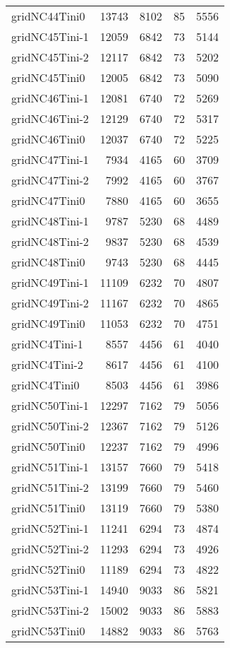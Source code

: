 \begin{longtable}{lrrrr}
gridNC44Tini0 & 13743 & 8102 & 85 & 5556 \\
gridNC45Tini-1 & 12059 & 6842 & 73 & 5144 \\
gridNC45Tini-2 & 12117 & 6842 & 73 & 5202 \\
gridNC45Tini0 & 12005 & 6842 & 73 & 5090 \\
gridNC46Tini-1 & 12081 & 6740 & 72 & 5269 \\
gridNC46Tini-2 & 12129 & 6740 & 72 & 5317 \\
gridNC46Tini0 & 12037 & 6740 & 72 & 5225 \\
gridNC47Tini-1 & 7934 & 4165 & 60 & 3709 \\
gridNC47Tini-2 & 7992 & 4165 & 60 & 3767 \\
gridNC47Tini0 & 7880 & 4165 & 60 & 3655 \\
gridNC48Tini-1 & 9787 & 5230 & 68 & 4489 \\
gridNC48Tini-2 & 9837 & 5230 & 68 & 4539 \\
gridNC48Tini0 & 9743 & 5230 & 68 & 4445 \\
gridNC49Tini-1 & 11109 & 6232 & 70 & 4807 \\
gridNC49Tini-2 & 11167 & 6232 & 70 & 4865 \\
gridNC49Tini0 & 11053 & 6232 & 70 & 4751 \\
gridNC4Tini-1 & 8557 & 4456 & 61 & 4040 \\
gridNC4Tini-2 & 8617 & 4456 & 61 & 4100 \\
gridNC4Tini0 & 8503 & 4456 & 61 & 3986 \\
gridNC50Tini-1 & 12297 & 7162 & 79 & 5056 \\
gridNC50Tini-2 & 12367 & 7162 & 79 & 5126 \\
gridNC50Tini0 & 12237 & 7162 & 79 & 4996 \\
gridNC51Tini-1 & 13157 & 7660 & 79 & 5418 \\
gridNC51Tini-2 & 13199 & 7660 & 79 & 5460 \\
gridNC51Tini0 & 13119 & 7660 & 79 & 5380 \\
gridNC52Tini-1 & 11241 & 6294 & 73 & 4874 \\
gridNC52Tini-2 & 11293 & 6294 & 73 & 4926 \\
gridNC52Tini0 & 11189 & 6294 & 73 & 4822 \\
gridNC53Tini-1 & 14940 & 9033 & 86 & 5821 \\
gridNC53Tini-2 & 15002 & 9033 & 86 & 5883 \\
gridNC53Tini0 & 14882 & 9033 & 86 & 5763 \\

\end{longtable}

